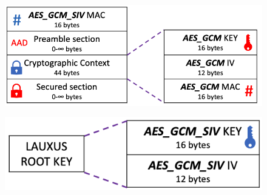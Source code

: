 \documentclass[../main.tex]{subfiles}
\begin{document}
\begin{figure}[h]
    \centering
    \begin{minipage}{.5\textwidth}
        \centering
        \includegraphics[width=.9\linewidth]{images/lauxus/metadata_encryption}
        \label{figure:lauxus:metadate_encryption}
    \end{minipage}%
    \begin{minipage}{.5\textwidth}
        \centering
        \includegraphics[width=.9\linewidth]{images/lauxus/root_key}
        \label{figure:lauxus:root_key}
    \end{minipage}
\end{figure}
\end{document}
